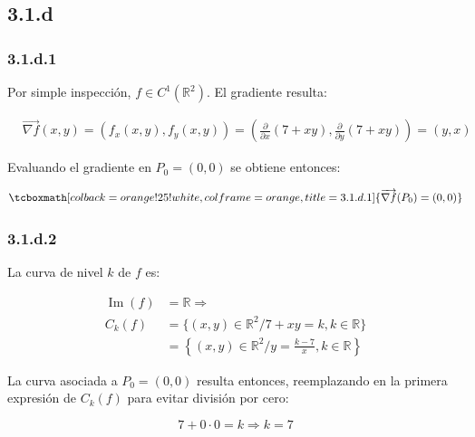 \documentclass{article}
\renewcommand{\Bbb}{\mathbb}
\begin{document}
\subsection*{3.1.d}
\label{subsec:3.1.d}

\subsubsection*{3.1.d.1}
\label{subsubsec:3.1.d.1}

Por simple inspección, $f \in C^1(\Bbb R^2)$. El gradiente resulta:

\begin{align}
& \overrightarrow{ \nabla f }(x,y) = (f_x(x,y), f_y(x,y)) = \left( \frac{\partial}{\partial x}(7 +x y), \frac{\partial}{\partial y}(7 + xy) \right) = (y, x)
\end{align}
 
Evaluando el gradiente en $P_0 = (0,0)$ se obtiene entonces:

\begin{equation}
\tcboxmath[colback=orange!25!white,colframe=orange,title=3.1.d.1]
{
\overrightarrow{ \nabla f }(P_0) = (0, 0)
}
\end{equation}

\subsubsection*{3.1.d.2}
\label{subsubsec:3.1.d.2}

La curva de nivel $k$ de $f$ es:

\begin{subequations}
\begin{align}
\mathop{Im}(f) &= \Bbb R \Rightarrow \\
C_k(f) &= \{ (x,y) \in \Bbb R^2 / 7 + xy = k, k \in \Bbb R \} \\
       &= \left\{ (x,y) \in \Bbb R^2 / y = \frac{k-7}{x}, k \in \Bbb R \right\}
\end{align}
\end{subequations}

La curva asociada a $P_0 = (0,0)$ resulta entonces, reemplazando en la primera expresión de $C_k(f)$ para evitar división por cero:

\begin{equation}
7 + 0 \cdot 0 = k \Rightarrow k = 7
\end{equation}
\end{document}
